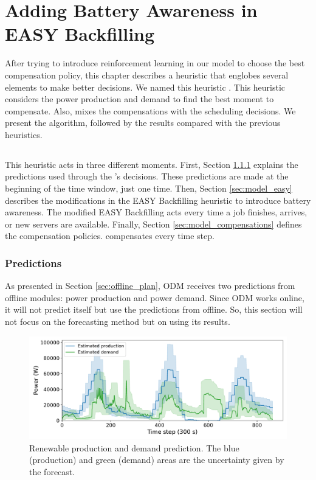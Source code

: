 \chapter{Adding Battery Awareness in EASY Backfilling}
\label{cha:heuristic}

\minitoc

After trying to introduce reinforcement learning in our model to choose the best compensation policy, this chapter describes a heuristic that englobes several elements to make better decisions. We named this heuristic \emph{\systemName}. This heuristic considers the power production and demand to find the best moment to compensate. Also, \emph{\systemName} mixes the compensations with the scheduling decisions. We present the algorithm, followed by the results compared with the previous heuristics.

\section{\systemName}

This heuristic acts in three different moments. First, Section \ref{sec:model_predictions} explains the predictions used through the \emph{\systemName}'s decisions. These predictions are made at the beginning of the time window, just one time. Then, Section \ref{sec:model_easy} describes the modifications in the EASY Backfilling heuristic to introduce battery awareness. The modified EASY Backfilling acts every time a job finishes, arrives, or new servers are available. Finally, Section \ref{sec:model_compensations} defines the compensation policies. \emph{\systemName} compensates every time step.

\subsection{Predictions}
\label{sec:model_predictions}

As presented in Section \ref{sec:offline_plan}, ODM receives two predictions from offline modules: power production and power demand. Since ODM works online, it will not predict itself but use the predictions from offline. So, this section will not focus on the forecasting method but on using its results.

\begin{figure}[!htb]
    \centering
    \includegraphics[scale=0.5]{Images/Heuristic/predictions.pdf}
    \caption{Renewable production and demand prediction. The blue (production) and green (demand) areas are the uncertainty given by the forecast.}
    \label{fig:predictions}
\end{figure}

